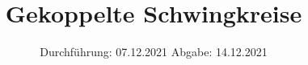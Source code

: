 

\subject{V355}
\title{Gekoppelte Schwingkreise}
\date{%
  Durchführung: 07.12.2021
  \hspace{3em}
  Abgabe: 14.12.2021
}



\maketitle
\thispagestyle{empty}
\tableofcontents
\newpage





\newpage




\printbibliography{}


